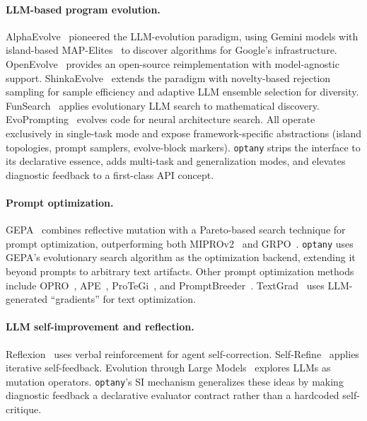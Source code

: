 \documentclass[sigconf,anonymous,review]{acmart}
\newcommand{\oa}{\texttt{optany}}
\newcommand{\asi}{SI}
\begin{document}
\paragraph{LLM-based program evolution.}
AlphaEvolve~\cite{alphaevolve2025} pioneered the LLM-evolution paradigm, using Gemini models with island-based MAP-Elites~\cite{mouret2015mapelites} to discover algorithms for Google's infrastructure. OpenEvolve~\cite{openevolve2025} provides an open-source reimplementation with model-agnostic support. ShinkaEvolve~\cite{shinkaevolve2025} extends the paradigm with novelty-based rejection sampling for sample efficiency and adaptive LLM ensemble selection for diversity. FunSearch~\cite{romera2024funsearch} applies evolutionary LLM search to mathematical discovery. EvoPrompting~\cite{chen2024evoprompting} evolves code for neural architecture search. All operate exclusively in single-task mode and expose framework-specific abstractions (island topologies, prompt samplers, evolve-block markers). \oa{} strips the interface to its declarative essence, adds multi-task and generalization modes, and elevates diagnostic feedback to a first-class API concept.

\paragraph{Prompt optimization.}
GEPA~\cite{agrawal2026gepa} combines reflective mutation with a Pareto-based search technique for prompt optimization, outperforming both MIPROv2~\cite{opsahl2024miprov2} and GRPO~\cite{shao2024grpo}. \oa{} uses GEPA's evolutionary search algorithm as the optimization backend, extending it beyond prompts to arbitrary text artifacts. Other prompt optimization methods include OPRO~\cite{yang2024opro}, APE~\cite{zhou2023ape}, ProTeGi~\cite{pryzant2023prompt}, and PromptBreeder~\cite{fernando2024promptbreeder}. TextGrad~\cite{yuksekgonul2024textgrad} uses LLM-generated ``gradients'' for text optimization.

\paragraph{LLM self-improvement and reflection.}
Reflexion~\cite{shinn2023reflexion} uses verbal reinforcement for agent self-correction. Self-Refine~\cite{madaan2023selfrefine} applies iterative self-feedback. Evolution through Large Models~\cite{lehman2022evolution} explores LLMs as mutation operators. \oa{}'s \asi{} mechanism generalizes these ideas by making diagnostic feedback a declarative evaluator contract rather than a hardcoded self-critique.
\end{document}
